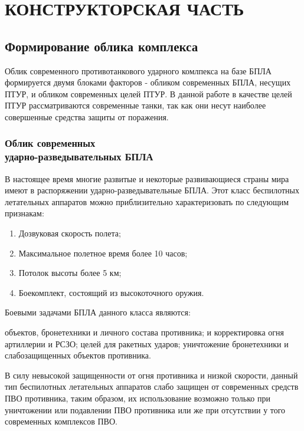 \chapter{КОНСТРУКТОРСКАЯ ЧАСТЬ}
\label{cha:ch_1}

\section{Формирование облика комплекса}
Облик современного противотанкового ударного комлпекса на базе БПЛА формируется двумя блоками факторов - обликом современных БПЛА, несущих ПТУР, и обликом современных целей ПТУР. В данной работе в качестве целей ПТУР рассматриваются современные танки, так как они несут наиболее совершенные средства защиты от поражения.

\subsection{Облик современных \\ударно-разведывательных БПЛА}
В настоящее время многие развитые  и некоторые развивающиеся страны мира имеют в распоряжении ударно-разведывательные БПЛА. Этот класс беспилотных летательных аппаратов можно приблизительно характеризовать по следующим признакам:

\begin{enumerate}[1.]
	\item Дозвуковая скорость полета;
	\item Максимальное полетное время более 10 часов;
	\item Потолок высоты более 5 км;
	\item Боекомплект, состоящий из высокоточного оружия.
\end{enumerate}

Боевыми задачами БПЛА данного класса являются:
\begin{enumerate}[1.]
	 объектов, бронетехники и личного состава противника;
	 и корректировка огня артиллерии и РСЗО;
	 целей для ракетных ударов;
	 уничтожение бронетехники и слабозащищенных объектов противника.
\end{enumerate}

В силу невысокой защищенности от огня противника и низкой скорости, данный тип беспилотных летательных аппаратов слабо защищен от современных средств ПВО противника, таким образом, их использование возможно только при уничтожении или подавлении ПВО противника или же при отсутствии у того современных комплексов ПВО.

